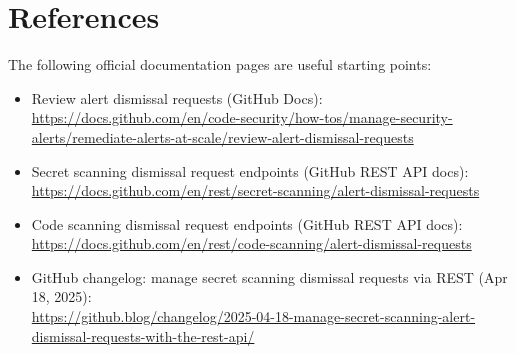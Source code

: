 \documentclass[11pt]{article}
\begin{document}
\section{References}

The following official documentation pages are useful starting points:
\begin{itemize}
  \item Review alert dismissal requests (GitHub Docs):\\
  \url{https://docs.github.com/en/code-security/how-tos/manage-security-alerts/remediate-alerts-at-scale/review-alert-dismissal-requests}
  \item Secret scanning dismissal request endpoints (GitHub REST API docs):\\
  \url{https://docs.github.com/en/rest/secret-scanning/alert-dismissal-requests}
  \item Code scanning dismissal request endpoints (GitHub REST API docs):\\
  \url{https://docs.github.com/en/rest/code-scanning/alert-dismissal-requests}
  \item GitHub changelog: manage secret scanning dismissal requests via REST (Apr 18, 2025):\\
  \url{https://github.blog/changelog/2025-04-18-manage-secret-scanning-alert-dismissal-requests-with-the-rest-api/}
\end{itemize}
\end{document}
